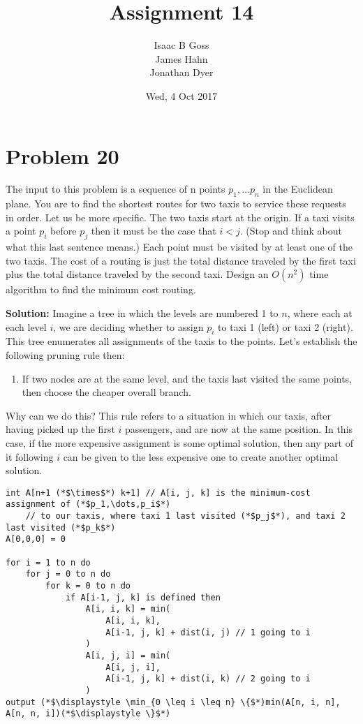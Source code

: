 \documentclass{article}
\author{Isaac B Goss\\ James Hahn\\ Jonathan Dyer}
\title{Assignment 14}
\date{Wed, 4 Oct 2017}
\providecommand{\prob}[1]{\section*{Problem #1}}
\providecommand{\soln}{\textbf{Solution: }}
\begin{document}
\maketitle
\prob{20}
The input to this problem is a sequence of n points $p_1, \dots p_n$ in the Euclidean plane. You are to find the shortest routes for two taxis to service these requests in order. Let us be more specific. The two taxis start at the origin. If a taxi visits a point $p_i$ before $p_j$ then it must be the case that $i < j$. (Stop and think about what this last sentence means.) Each point must be visited by at least one of the two taxis. The cost of a routing is just the total distance traveled by the first taxi plus the total distance traveled by the second taxi. Design an $O\left(n^2\right)$ time algorithm to find the minimum cost routing.

\soln Imagine a tree in which the levels are numbered 1 to $n$, where each at each level $i$, we are deciding whether to assign $p_i$ to taxi 1 (left) or taxi 2 (right).
This tree enumerates all assignments of the taxis to the points.
Let's establish the following pruning rule then:
\begin{enumerate}
    \item If two nodes are at the same level, and the taxis last visited the same points, then choose the cheaper overall branch.
\end{enumerate}

Why can we do this? This rule refers to a situation in which our taxis, after having picked up the first $i$ passengers, and are now at the same position.
In this case, if the more expensive assignment is some optimal solution, then any part of it following $i$ can be given to the less expensive one to create another optimal solution.

\begin{lstlisting}
int A[n+1 (*$\times$*) k+1] // A[i, j, k] is the minimum-cost assignment of (*$p_1,\dots,p_i$*)
    // to our taxis, where taxi 1 last visited (*$p_j$*), and taxi 2 last visited (*$p_k$*)
A[0,0,0] = 0

for i = 1 to n do 
    for j = 0 to n do
        for k = 0 to n do
            if A[i-1, j, k] is defined then
                A[i, i, k] = min( 
                    A[i, i, k], 
                    A[i-1, j, k] + dist(i, j) // 1 going to i
                )
                A[i, j, i] = min( 
                    A[i, j, i], 
                    A[i-1, j, k] + dist(i, k) // 2 going to i
                )
output (*$\displaystyle \min_{0 \leq i \leq n} \{$*)min(A[n, i, n], A[n, n, i])(*$\displaystyle \}$*)
\end{lstlisting}
\end{document}
